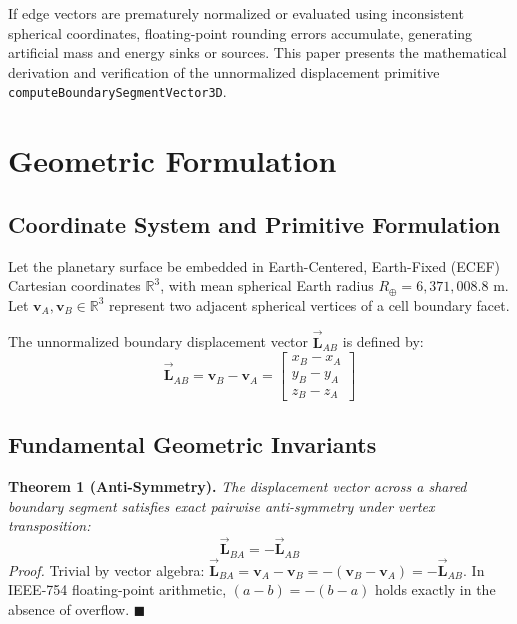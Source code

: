 \documentclass[10pt,journal,compsoc]{IEEEtran}
\begin{document}
If edge vectors are prematurely normalized or evaluated using inconsistent spherical coordinates, floating-point rounding errors accumulate, generating artificial mass and energy sinks or sources. This paper presents the mathematical derivation and verification of the unnormalized displacement primitive \texttt{computeBoundarySegmentVector3D}.

\section{Geometric Formulation}

\subsection{Coordinate System and Primitive Formulation}
Let the planetary surface be embedded in Earth-Centered, Earth-Fixed (ECEF) Cartesian coordinates $\mathbb{R}^3$, with mean spherical Earth radius $R_{\oplus} = 6,371,008.8\text{ m}$. Let $\mathbf{v}_A, \mathbf{v}_B \in \mathbb{R}^3$ represent two adjacent spherical vertices of a cell boundary facet.

The unnormalized boundary displacement vector $\vec{\mathbf{L}}_{AB}$ is defined by:
\begin{equation}
\vec{\mathbf{L}}_{AB} = \mathbf{v}_B - \mathbf{v}_A = \begin{bmatrix} x_B - x_A \\ y_B - y_A \\ z_B - z_A \end{bmatrix}
\end{equation}

\subsection{Fundamental Geometric Invariants}
\textbf{Theorem 1 (Anti-Symmetry).} \textit{The displacement vector across a shared boundary segment satisfies exact pairwise anti-symmetry under vertex transposition:}
\begin{equation}
\vec{\mathbf{L}}_{BA} = -\vec{\mathbf{L}}_{AB}
\end{equation}
\textit{Proof.} Trivial by vector algebra: $\vec{\mathbf{L}}_{BA} = \mathbf{v}_A - \mathbf{v}_B = -(\mathbf{v}_B - \mathbf{v}_A) = -\vec{\mathbf{L}}_{AB}$. In IEEE-754 floating-point arithmetic, $(a - b) = -(b - a)$ holds exactly in the absence of overflow. $\blacksquare$
\end{document}
